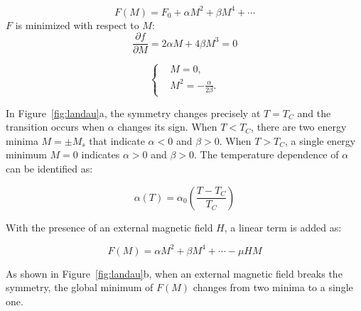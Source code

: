 \begin{equation}
F(M)=F_0+\alpha M^2 + \beta M^4 + \cdots
\end{equation}$F$ is minimized with respect to $M$:
\begin{equation}
\frac{\partial f}{\partial M}=2 \alpha M+ 4 \beta M^3 = 0
\end{equation}

\begin{equation}
\left\{
\begin{aligned}
&M = 0, \\
&M^2 = -\frac{\alpha}{2 \beta}.
\end{aligned}
\right.
\end{equation}

In Figure~\ref{fig:landau}a, the symmetry changes precisely at $T = T_C$ and the transition occurs when $\alpha$ changes its sign. When $T <T_C$, there are two energy minima $M= \pm M_s$ that indicate $\alpha <0$ and $\beta >0$. When $T >T_C$, a single energy minimum $M = 0$ indicates $\alpha >0$ and $\beta >0$. The temperature dependence of $\alpha$ can be identified as:

\begin{equation}
\alpha (T) =\alpha_0 \left( \frac{T - T_C}{T_C} \right)
\end{equation}

With the presence of an external magnetic field $H$, a linear term is added as:

\begin{equation}
F(M)=\alpha M^2 + \beta M^4 + \cdots - \mu H M
\end{equation}

As shown in Figure~\ref{fig:landau}b, when an external magnetic field breaks the symmetry, the global minimum of $F(M)$ changes from two minima to a single one.

